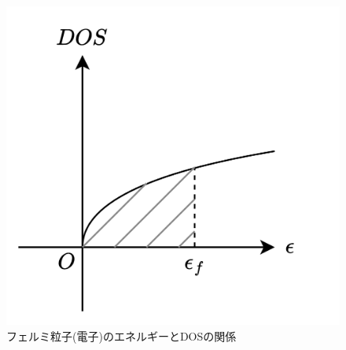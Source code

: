 \begin{figure}
	\centering
	\includegraphics[width=0.4\linewidth]{src/figures/fermi-dirac-distribution/fermi-dirac-distribution.png}
	\caption{フェルミ粒子(電子)のエネルギーとDOSの関係}\label{fig:fermi-dirac-distribution}
\end{figure}
